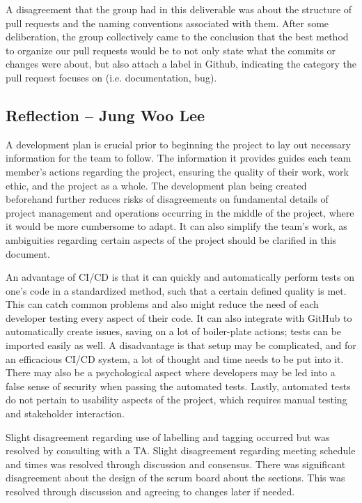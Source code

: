 \documentclass{article}
\begin{document}
A disagreement that the group had in this deliverable was about the structure
of pull requests and the naming conventions associated with them. After some
deliberation, the group collectively came to the conclusion that the best
method to organize our pull requests would be to not only state what the
commits or changes were about, but also attach a label in Github, indicating
the category the pull request focuses on (i.e. documentation, bug).

\subsection*{Reflection -- Jung Woo Lee}

A development plan is crucial prior to beginning the project to lay out 
necessary information for the team to follow. The information it provides 
guides each team member’s actions regarding the project, ensuring the 
quality of their work, work ethic, and the project as a whole. The 
development plan being created beforehand further reduces risks of 
disagreements on fundamental details of project management and operations
occurring in the middle of the project, where it would be more cumbersome 
to adapt. It can also simplify the team’s work, as ambiguities regarding 
certain aspects of the project should be clarified in this document. \newline

An advantage of CI/CD is that it can quickly and automatically perform
tests on one’s code in a standardized method, such that a certain defined 
quality is met. This can catch common problems and also might reduce the
need of each developer testing every aspect of their code. It can also 
integrate with GitHub to automatically create issues, saving on a lot 
of boiler-plate actions; tests can be imported easily as well. A 
disadvantage is that setup may be complicated, and for an efficacious 
CI/CD system, a lot of thought and time needs to be put into it. There 
may also be a psychological aspect where developers may be led into a 
false sense of security when passing the automated tests. Lastly, 
automated tests do not pertain to usability aspects of the project, 
which requires manual testing and stakeholder interaction.\newline

Slight disagreement regarding use of labelling and tagging occurred 
but was resolved by consulting with a TA. Slight disagreement regarding 
meeting schedule and times was resolved through discussion and consensus. 
There was significant disagreement about the design of the scrum board 
about the sections. This was resolved through discussion and agreeing 
to changes later if needed.\newline
\end{document}
